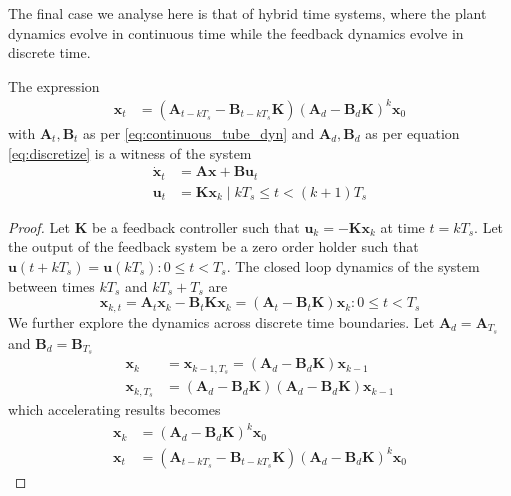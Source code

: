 \documentclass[sigconf]{llncs}
\newcommand{\mat}[1]{\boldsymbol{#1}}
\renewcommand{\vec}[1]{\boldsymbol{#1}}
\begin{document}
The final case we analyse here is that of hybrid time systems, where the
plant dynamics evolve in continuous time while the feedback dynamics evolve
in discrete time.

\begin{theorem}
The expression
 \begin{align}
 \vec{x}_{t} &= (\mat{A}_{t-kT_s}-\mat{B}_{t-kT_s}\mat{K}) (\mat{A}_d-\mat{B}_d\mat{K})^k\vec{x}_0
 \label{eq:cyber_feedback}
 \end{align}
 with $\mat{A}_t, \mat{B}_t$ as per \eqref{eq:continuous_tube_dyn} and $\mat{A}_d, \mat{B}_d$ as per equation \eqref{eq:discretize} is a witness of the system
 \begin{align}
 \dot{\vec{x}}_{t} &= \mat{A}\vec{x}+\mat{B}\vec{u}_t\nonumber\\
 \vec{u}_t&=\mat{K}\vec{x}_k  \mid  kT_s \leq t < (k+1)T_s
 \end{align}
 \end{theorem}

\begin{proof}
Let $\mat{K}$ be a feedback controller such that $\vec{u}_k=-\mat{K}\vec{x}_k$ at time $t=kT_s$. Let the output of
the feedback system be a zero order holder such that $\vec{u}(t+kT_s)=\vec{u}(kT_s) : 0 \leq t < T_s$.
The closed loop dynamics of the system between times $kT_s$ and $kT_s+T_s$ are
\begin{equation}
\vec{x}_{k,t}=\mat{A}_t\vec{x}_k-\mat{B}_t\mat{K}\vec{x}_k = (\mat{A}_t-\mat{B}_t\mat{K})\vec{x}_k : 0 \leq t < T_s
\end{equation}
We further explore the dynamics across discrete time boundaries. Let $\mat{A}_d=\mat{A}_{T_s}$ and $\mat{B}_d=\mat{B}_{T_s}$
\begin{align}
\vec{x}_{k}&=\vec{x}_{k-1,T_s}= (\mat{A}_d-\mat{B}_d\mat{K})\vec{x}_{k-1}\\
\vec{x}_{k,T_s} &= (\mat{A}_d-\mat{B}_d\mat{K}) (\mat{A}_d-\mat{B}_d\mat{K})\vec{x}_{k-1}
\end{align}
which accelerating results becomes
\begin{align}
\label{eq:feedback_sampled_cont}
\vec{x}_{k} &= (\mat{A}_d-\mat{B}_d\mat{K}) ^k\vec{x}_0\\
\vec{x}_{t} &= (\mat{A}_{t-kT_s}-\mat{B}_{t-kT_s}\mat{K}) (\mat{A}_d-\mat{B}_d\mat{K})^k\vec{x}_0
\label{eq:feedback_cont}
\end{align}
\end{proof}

\end{document}
